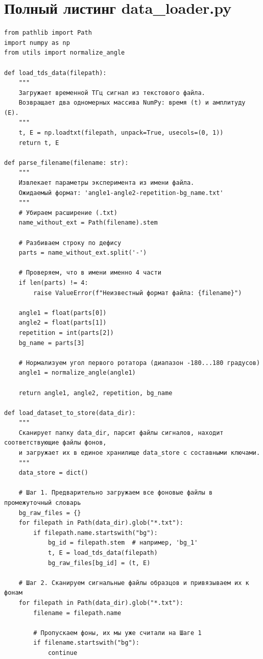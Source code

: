 \section{Полный листинг data\_loader.py} \label{app:data_loader}
\begin{verbatim}
from pathlib import Path
import numpy as np
from utils import normalize_angle

def load_tds_data(filepath):
    """
    Загружает временной ТГц сигнал из текстового файла.
    Возвращает два одномерных массива NumPy: время (t) и амплитуду (E).
    """
    t, E = np.loadtxt(filepath, unpack=True, usecols=(0, 1))
    return t, E

def parse_filename(filename: str):
    """
    Извлекает параметры эксперимента из имени файла.
    Ожидаемый формат: 'angle1-angle2-repetition-bg_name.txt'
    """
    # Убираем расширение (.txt)
    name_without_ext = Path(filename).stem 
    
    # Разбиваем строку по дефису
    parts = name_without_ext.split('-')
    
    # Проверяем, что в имени именно 4 части
    if len(parts) != 4:
        raise ValueError(f"Неизвестный формат файла: {filename}")
        
    angle1 = float(parts[0])
    angle2 = float(parts[1])
    repetition = int(parts[2])
    bg_name = parts[3]
    
    # Нормализуем угол первого ротатора (диапазон -180...180 градусов)
    angle1 = normalize_angle(angle1)
        
    return angle1, angle2, repetition, bg_name

def load_dataset_to_store(data_dir):
    """
    Сканирует папку data_dir, парсит файлы сигналов, находит соответствующие файлы фонов,
    и загружает их в единое хранилище data_store с составными ключами.
    """
    data_store = dict()
    
    # Шаг 1. Предварительно загружаем все фоновые файлы в промежуточный словарь
    bg_raw_files = {}
    for filepath in Path(data_dir).glob("*.txt"):
        if filepath.name.startswith("bg"):
            bg_id = filepath.stem  # например, 'bg_1'
            t, E = load_tds_data(filepath)
            bg_raw_files[bg_id] = (t, E)
            
    # Шаг 2. Сканируем сигнальные файлы образцов и привязываем их к фонам
    for filepath in Path(data_dir).glob("*.txt"):
        filename = filepath.name
        
        # Пропускаем фоны, их мы уже считали на Шаге 1
        if filename.startswith("bg"):
            continue
            

\end{verbatim}
